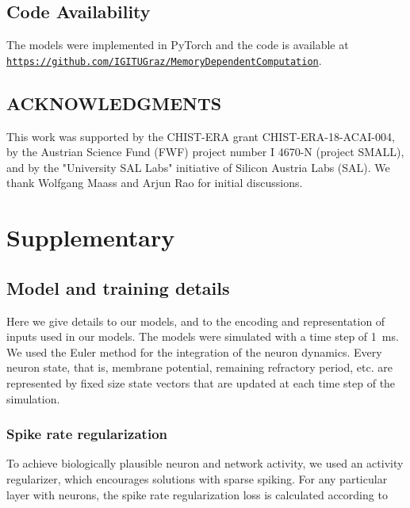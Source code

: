 \documentclass{article}
\begin{document}
\subsection*{Code Availability}
The models were implemented in PyTorch \cite{paszke2019pytorch} and the code is available at \href{https://github.com/IGITUGraz/MemoryDependentComputation}{\nolinkurl{https://github.com/IGITUGraz/MemoryDependentComputation}}.

\subsection*{ACKNOWLEDGMENTS}
This work was supported by the CHIST-ERA grant CHIST-ERA-18-ACAI-004, by the Austrian Science Fund (FWF) project number I 4670-N (project SMALL), and by the "University SAL Labs" initiative of Silicon Austria Labs (SAL). We thank Wolfgang Maass and Arjun Rao for initial discussions.



\printbibliography


\clearpage
\appendix
\setcounter{equation}{0}
\setcounter{figure}{0}
\setcounter{table}{0}
\renewcommand{\thefigure}{S\arabic{figure}}
\renewcommand{\thetable}{S\arabic{table}}

\section*{Supplementary}

\subsection*{Model and training details}
Here we give details to our models, and to the encoding and representation of inputs used in our models. The models were simulated with a time step  of \SI{1}{ms}. We used the Euler method for the integration of the neuron dynamics. Every neuron state, that is, membrane potential, remaining refractory period, etc. are represented by fixed size state vectors that are updated at each time step of the simulation.

\subsubsection*{Spike rate regularization}
\label{sec:supp-rate_regularization}
To achieve biologically plausible neuron and network activity, we used an
 activity regularizer, which encourages solutions with sparse spiking. For any particular layer with  neurons, the spike rate regularization loss is calculated according to
\end{document}
